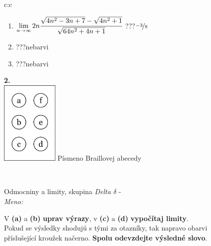 \documentclass[10pt]{report}
\begin{document}
\begin{tabular}{c:c}
\begin{minipage}[c][104.5mm][t]{0.5\linewidth}
\begin{center}
\begin{minipage}{0.79\linewidth}
\begin{center}
\begin{varwidth}{\linewidth}
\begin{enumerate}
\item $\lim\limits_{n\to\infty}2n\cfrac{\sqrt{4n^2-3n+7}-\sqrt{4n^2+1}}{\sqrt{64n^2+4n+1}}$\quad \dotfill\; ???\;\dotfill \quad $\nicefrac{-3}{8}$
\item \quad \dotfill\; ???\;\dotfill \quad nebarvi
\item \quad \dotfill\; ???\;\dotfill \quad nebarvi
\end{enumerate}
\end{varwidth}
\end{center}
\end{minipage}
\begin{minipage}{0.20\linewidth}
\begin{center}
{\Huge\bfseries 2.} \\[2mm]
\includegraphics[height=40mm]{../images/braille.png}
{\small Písmeno Braillovej abecedy}
\end{center}
\end{minipage}
\end{center}
\end{minipage}
\\ \hdashline
\begin{minipage}[c][104.5mm][t]{0.5\linewidth}
\begin{center}
\vspace{7mm}
{\huge Odmocniny a limity, skupina \textit{Delta $\delta$} -}\\[5mm]
\textit{Meno:}\phantom{xxxxxxxxxxxxxxxxxxxxxxxxxxxxxxxxxxxxxxxxxxxxxxxxxxxxxxxxxxxxxxxxx}\\[5mm]
\begin{minipage}{0.95\linewidth}
\begin{center}
V \textbf{(a)} a \textbf{(b)} \textbf{uprav výrazy}, v \textbf{(c)} a \textbf{(d)} \textbf{vypočítaj limity}.\\Pokud se výsledky shodujú s tými za otazníky, tak napravo obarvi\\příslušející kroužek načerno. \textbf{Spolu odevzdejte výsledné slovo}.
\end{center}
\end{minipage}
\\[1mm]

\end{center}
\end{minipage}
\end{tabular}
\end{document}
